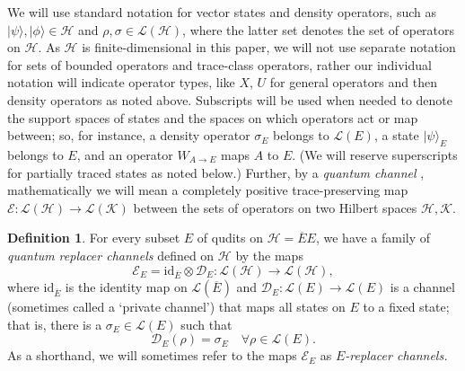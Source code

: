 \documentclass[11pt]{amsart}
\theoremstyle{definition}
\theoremstyle{definition}
\newtheorem{defn}[thm]{Definition}
\theoremstyle{definition}
\newcommand{\1}{\mathbb{I}}
\def\ket#1{| #1 \rangle}
\begin{document}
We will use standard notation for vector states and density operators, such as $\ket{\psi}, \ket{\phi}\in \mathcal H$ and $\rho , \sigma\in \mathcal L(\mathcal H)$, where the latter set denotes the set of operators on $\mathcal H$. As $\mathcal H$ is finite-dimensional in this paper, we will not use separate notation for sets of bounded operators and trace-class operators, rather our individual notation will indicate operator types, like $X$, $U$ for general operators and then density operators as noted above. Subscripts will be used when needed to denote the support spaces of states and the spaces on which operators act or map between; so, for instance, a density operator $\sigma_E$ belongs to $\mathcal L(E)$, a state $\ket{\psi}_E$ belongs to $E$, and an operator $W_{A\rightarrow E}$ maps $A$ to $E$. (We will reserve superscripts for partially traced states as noted below.) Further, by a {\it quantum channel} \cite{nielsen2010quantum,paulsen2002completely}, mathematically we will mean a completely positive trace-preserving map $\mathcal E: \mathcal L(\mathcal H) \rightarrow \mathcal L(\mathcal K)$ between the sets of operators on two Hilbert spaces $\mathcal H, \mathcal K$. 

\begin{defn}\label{def:q-replacer-channels}
For every subset $E$ of qudits on $\mathcal H =  \overline{E} E$, we have a family of {\it quantum replacer channels} defined on $\mathcal H$ by the maps 
\[ 
\mathcal E_E = \mathrm{id}_{\overline{E}} \otimes \mathcal D_{E} : \mathcal L(\mathcal H) \rightarrow \mathcal L(\mathcal H), 
\]
where $\mathrm{id}_{\overline{E}}$ is the identity map on $\mathcal L(\overline{E})$ and $\mathcal D_{E}: \mathcal L(E) \rightarrow \mathcal L(E)$ is a channel (sometimes called a `private channel') that maps all states on $E$ to a fixed state; that is, there is a $\sigma_E \in \mathcal L(E)$ such that 
\[
\mathcal D_{E}(\rho) = \sigma_E \quad  \forall \rho \in \mathcal L(E).  
\]
As a shorthand, we will sometimes refer to the maps $\mathcal E_E$ as {\it $E$-replacer channels.} 
\end{defn} 
\end{document}
